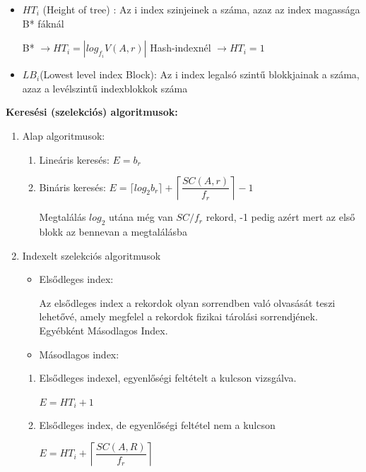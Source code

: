 \begin{enumerate}
\begin{itemize}
					\item $HT_i$ (Height of tree) : Az i index szinjeinek a száma, azaz az index magassága B* fáknál

						\forceindent B* $\rightarrow HT_i = | log_{f_i} V(A,r) |$ Hash-indexnél $\rightarrow HT_i = 1$

					\item $LB_i$(Lowest level index Block): Az i index legalsó szintű blokkjainak a száma, azaz a levélszintű indexblokkok száma
				\end{itemize}

			\textbf{Keresési (szelekciós) algoritmusok:}
			\begin{enumerate}
				\item Alap algoritmusok:
					\begin{enumerate}
						\item Lineáris keresés: $E = b_r$

						\item Bináris keresés: $E = \lceil log_2 b_r \rceil + \left\lceil \dfrac{SC(A,r)}{f_r} \right\rceil -1$

							\forceindent Megtalálás $log_2$ utána még van $SC / f_r$ rekord, -1 pedig azért mert az első blokk az bennevan a megtalálásba
					\end{enumerate}

				\item Indexelt szelekciós algoritmusok
				\begin{itemize}
					\item Elsődleges index:

						\forceindent Az elsődleges index a rekordok olyan sorrendben való olvasását teszi lehetővé, amely megfelel a rekordok fizikai tárolási sorrendjének. Egyébként Másodlagos Index.

					\item Másodlagos index:\\[1pt]
				\end{itemize}


					\begin{enumerate}
						\item Elsődleges indexel, egyenlőségi feltételt a kulcson vizsgálva.

							\forceindent  $E = HT_i + 1$

						\item Elsődleges index, de egyenlőségi feltétel nem a kulcson

							\forceindent $E = HT_i + \left\lceil \dfrac{SC(A,R)}{f_r} \right\rceil $


\end{enumerate}
\end{enumerate}
\end{enumerate}
